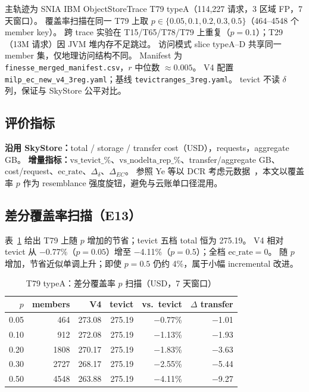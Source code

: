 \documentclass[conference]{IEEEtran}
\begin{document}
主轨迹为 SNIA IBM ObjectStoreTrace T79 typeA（114{,}227 请求，3 区域 FP，7 天窗口）。
覆盖率扫描在同一 T79 上取 $p\in\{0.05,0.1,0.2,0.3,0.5\}$（464--4548 个 member key）。
跨 trace 实验在 T15/T65/T78/T79 上重复（$p{=}0.1$）；T29（13M 请求）因 JVM 堆内存不足跳过。
访问模式 slice typeA--D 共享同一 member 集，仅地理访问结构不同。
Manifest 为 \texttt{finesse\_merged\_manifest.csv}，$r$ 中位数 $\approx 0.005$。
V4 配置 \texttt{milp\_ec\_new\_v4\_3reg.yaml}；基线 \texttt{tevictranges\_3reg.yaml}。
tevict 不读 $\delta$ 列，保证与 SkyStore 公平对比。

\subsection{评价指标}

\textbf{沿用 SkyStore：}total / storage / transfer cost（USD），requests，aggregate GB。
\textbf{增量指标：}$\mathrm{vs\_tevict\_\%}$、$\mathrm{vs\_nodelta\_rep\_\%}$、transfer/aggregate GB、cost/request、$\mathrm{ec\_rate}$、$\Delta_\delta$、$\Delta_{EC}$。
参照 Ye 等以 DCR 考虑元数据~\cite{ye2021fast}，本文以覆盖率 $p$ 作为 resemblance 强度旋钮，避免与云账单口径混用。

\subsection{差分覆盖率扫描（E13）}

表~\ref{tab:saturation} 给出 T79 上随 $p$ 增加的节省；tevict 五档 total 恒为 275.19。
V4 相对 tevict 从 $-$0.77\%（$p{=}0.05$）增至 $-$4.11\%（$p{=}0.5$）；全档 $\mathrm{ec\_rate}{=}0$。
随 $p$ 增加，节省近似单调上升；即使 $p{=}0.5$ 仍约 4\%，属于小幅 incremental 改进。

\begin{table}[t]
\centering
\caption{T79 typeA：差分覆盖率 $p$ 扫描（USD，7 天窗口）}
\label{tab:saturation}
\begin{tabular}{rrrrrr}
\toprule
$p$ & members & V4 & tevict & vs.\ tevict & $\Delta$ transfer \\
\midrule
0.05 & 464   & 273.08 & 275.19 & $-$0.77\% & $-$1.01 \\
0.10 & 912   & 272.08 & 275.19 & $-$1.13\% & $-$1.93 \\
0.20 & 1808  & 270.17 & 275.19 & $-$1.83\% & $-$3.63 \\
0.30 & 2727  & 268.17 & 275.19 & $-$2.55\% & $-$5.44 \\
0.50 & 4548  & 263.88 & 275.19 & $-$4.11\% & $-$9.27 \\
\bottomrule
\end{tabular}
\end{table}
\end{document}
